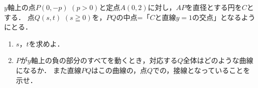\documentclass[../../main.tex]{subfiles}
\begin{document}
$y$軸上の点$P(0,-p)$ $(p>0)$と定点$A(0,2)$に対し，$AP$を直径とする円を$C$とする．
点$Q(s,t)$ $(s\geqq0)$を，$PQ$の中点=「$C$と直線$y=1$の交点」となるようにとる．
\begin{enumerate}
  \item $s$，$t$を求めよ．
  \item $P$が$y$軸上の負の部分のすべてを動くとき，対応する$Q$全体はどのような曲線になるか．
    また直線$PQ$はこの曲線の，点$Q$での，接線となっていることを示せ．
\end{enumerate}
\end{document}
